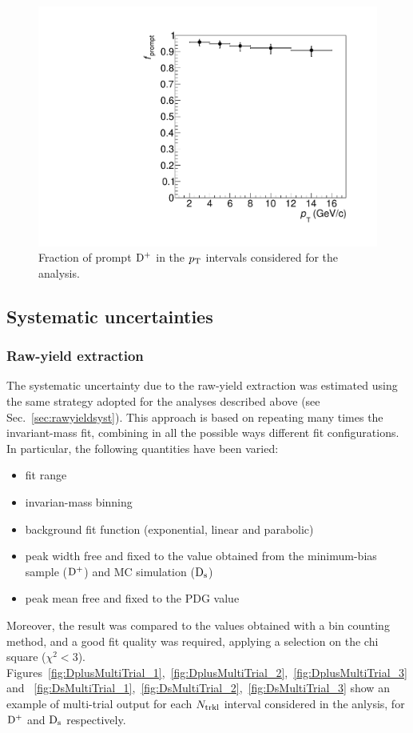 \begin{figure}[htpb]
\centering
 \includegraphics[width=.7\textwidth]{FigCap6/DplusFprompt_Nb_d0cut_1_200.pdf}
  \caption{Fraction of prompt ${\rm D^+}$ in the $p_{\rm T}$ intervals considered for the analysis.}
 \label{fig:DplusfPromptVsNtrkl}
\end{figure}

\subsection {Systematic uncertainties}
\subsubsection{Raw-yield extraction}
The systematic uncertainty due to the raw-yield extraction was estimated using the same strategy adopted for the analyses described above (see Sec.~\ref{sec:rawyieldsyst}). This approach is based on repeating many times the invariant-mass fit, combining in all the possible ways different fit configurations. In particular, the following quantities have been varied:
\begin{itemize}
\item fit range
\item invarian-mass binning
\item background fit function (exponential, linear and parabolic)
\item peak width free and fixed to the value obtained from the minimum-bias sample (${\rm D^+}$) and MC simulation (${\rm D_s}$)
\item peak mean free and fixed to the PDG value
\end{itemize} 
Moreover, the result was compared to the values obtained with a bin counting method, and a good fit quality was required, applying a selection on the chi square ($\chi^2<3$). Figures~\ref{fig:DplusMultiTrial_1},~\ref{fig:DplusMultiTrial_2},~\ref{fig:DplusMultiTrial_3} and ~\ref{fig:DsMultiTrial_1},~\ref{fig:DsMultiTrial_2},~\ref{fig:DsMultiTrial_3} show an example of multi-trial output for each $N_{\rm trkl}$ interval considered in the anlysis, for ${\rm D^+}$ and ${\rm D_s}$ respectively.  
 

